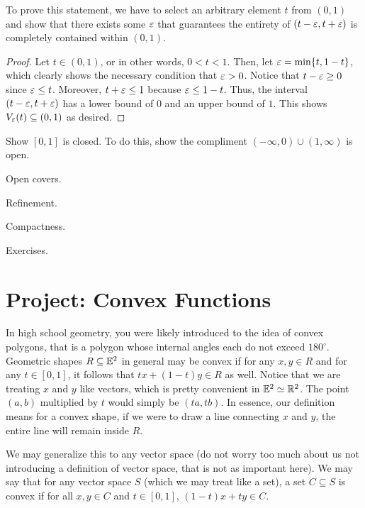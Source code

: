 \begin{example}
    To prove this statement, we have to select an arbitrary element $t$ from $(0,1)$ and show that there exists some $\varepsilon$ that guarantees the entirety of $(t-\varepsilon, t+\varepsilon)$ is completely contained within $(0,1)$.\par
    \begin{proof}
        Let $t\in(0,1)$, or in other words, $0<t<1$. Then, let $\varepsilon=\min\{t,1-t\}$, which clearly shows the necessary condition that $\varepsilon>0$. Notice that $t-\varepsilon\geq0$ since $\varepsilon\leq t$. Moreover, $t+\varepsilon\leq1$ because $\varepsilon\leq1-t$. Thus, the interval $(t-\varepsilon,t+\varepsilon)$ has a lower bound of $0$ and an upper bound of $1$. This shows $V_\varepsilon(t)\subseteq(0,1)$ as desired. 
    \end{proof}
\end{example}

\begin{exercise}
    Show $[0,1]$ is closed. To do this, show the compliment $(-\infty,0)\cup(1,\infty)$ is open.
\end{exercise}

Open covers. \par

Refinement. \par

Compactness. \par

Exercises. \par

\clearpage


\section*{Project: \textbf{Convex Functions}}
\setcounter{section}{5}

In high school geometry, you were likely introduced to the idea of convex polygons, that is a polygon whose internal angles each do not exceed $180^\circ$. Geometric shapes $R \subseteq \mathbb{E}^2$ in general may be convex if for any $x,y\in R$ and for any $t\in[0,1]$, it follows that $tx+(1-t)y\in R$ as well. Notice that we are treating $x$ and $y$ like vectors, which is pretty convenient in $\mathbb{E}^2\simeq \mathbb{R}^2$. The point $(a,b)$ multiplied by $t$ would simply be $(ta,tb)$. In essence, our definition means for a convex shape, if we were to draw a line connecting $x$ and $y$, the entire line will remain inside $R$. \par

We may generalize this to any vector space (do not worry too much about us not introducing a definition of vector space, that is not as important here). We may say that for any vector space $S$ (which we may treat like a set), a set $C\subseteq S$ is convex if for all $x,y\in C$ and $t\in[0,1]$, $(1-t)x+ty\in C$.

